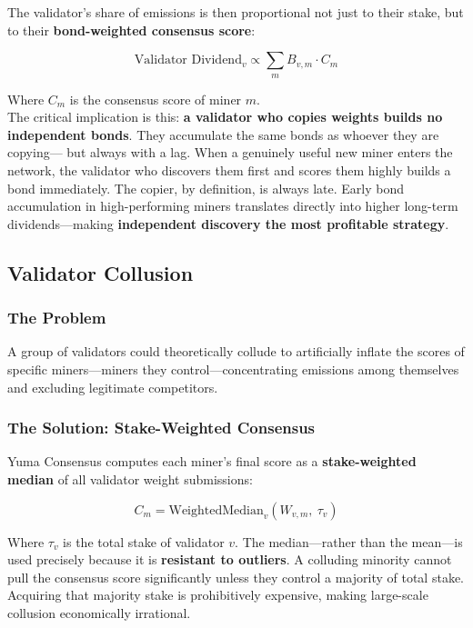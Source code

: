 \documentclass[12pt, a4paper, oneside]{report}
\theoremstyle{definition}
\begin{document}
\vspace{0.4cm}
The validator's share of emissions is then proportional not just to their stake, 
but to their \textbf{bond-weighted consensus score}:

\[
  \text{Validator Dividend}_{v} \propto \sum_{m} B_{v,m} \cdot C_{m}
\]

Where $C_{m}$ is the consensus score of miner $m$.\\[0.4cm]

The critical implication is this: \textbf{a validator who copies weights builds 
no independent bonds}. They accumulate the same bonds as whoever they are copying—
but always with a lag. When a genuinely useful new miner enters the network, the 
validator who discovers them first and scores them highly builds a bond immediately. 
The copier, by definition, is always late. Early bond accumulation in high-performing 
miners translates directly into higher long-term dividends—making \textbf{independent 
discovery the most profitable strategy}.

\subsection{Validator Collusion}

\subsubsection*{The Problem}

A group of validators could theoretically collude to artificially inflate the 
scores of specific miners—miners they control—concentrating emissions among 
themselves and excluding legitimate competitors.

\subsubsection*{The Solution: Stake-Weighted Consensus}

Yuma Consensus computes each miner's final score as a \textbf{stake-weighted 
median} of all validator weight submissions:

\[
  C_{m} = \text{WeightedMedian}_{v}\left(W_{v,m},\ \tau_{v}\right)
\]

Where $\tau_{v}$ is the total stake of validator $v$. The median—rather than 
the mean—is used precisely because it is \textbf{resistant to outliers}. A 
colluding minority cannot pull the consensus score significantly unless they 
control a majority of total stake. Acquiring that majority stake is 
prohibitively expensive, making large-scale collusion economically irrational.
\end{document}
